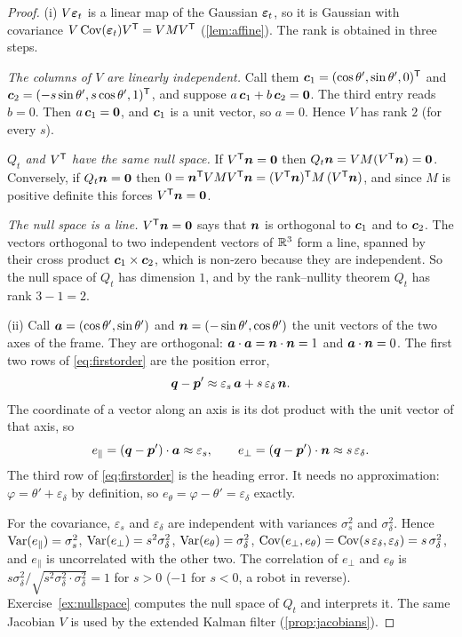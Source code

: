 \begin{proof}
(i) $V\bm{\varepsilon}_t$ is a linear map of the Gaussian $\bm{\varepsilon}_t$, so it is
Gaussian with covariance $V\operatorname{Cov}(\bm{\varepsilon}_t)V^{\mathsf{T}}=VMV^{\mathsf{T}}$
(\cref{lem:affine}). The rank is obtained in three steps.

\emph{The columns of $V$ are linearly independent.} Call them
$\bm{c}_1=(\cos\theta',\sin\theta',0)^{\mathsf{T}}$ and
$\bm{c}_2=(-s\sin\theta',s\cos\theta',1)^{\mathsf{T}}$, and suppose
$a\,\bm{c}_1+b\,\bm{c}_2=\bm{0}$. The third entry reads $b=0$. Then
$a\,\bm{c}_1=\bm{0}$, and $\bm{c}_1$ is a unit vector, so $a=0$. Hence
$V$ has rank $2$ (for every $s$).

\emph{$Q_t$ and $V^{\mathsf{T}}$ have the same null space.} If $V^{\mathsf{T}}\bm{n}=\bm{0}$
then $Q_t\bm{n}=VM(V^{\mathsf{T}}\bm{n})=\bm{0}$. Conversely, if
$Q_t\bm{n}=\bm{0}$ then
$0=\bm{n}^{\mathsf{T}} VMV^{\mathsf{T}}\bm{n}=(V^{\mathsf{T}}\bm{n})^{\mathsf{T}} M\,(V^{\mathsf{T}}\bm{n})$, and since $M$ is
positive definite this forces $V^{\mathsf{T}}\bm{n}=\bm{0}$.

\emph{The null space is a line.} $V^{\mathsf{T}}\bm{n}=\bm{0}$ says that $\bm{n}$
is orthogonal to $\bm{c}_1$ and to $\bm{c}_2$. The vectors orthogonal to
two independent vectors of $\mathbb{R}^3$ form a line, spanned by their cross
product $\bm{c}_1\times\bm{c}_2$, which is non-zero because they are
independent. So the null space of $Q_t$ has dimension $1$, and by the
rank--nullity theorem $Q_t$ has rank $3-1=2$.

(ii) Call $\bm{a}=(\cos\theta',\sin\theta')$ and
$\bm{n}=(-\sin\theta',\cos\theta')$ the unit vectors of the two axes of
the frame. They are orthogonal:
$\bm{a}\cdot\bm{a}=\bm{n}\cdot\bm{n}=1$ and $\bm{a}\cdot\bm{n}=0$.
The first two rows of \eqref{eq:firstorder} are the position error,
\[
  \bm{q}-\bm{p}'\approx\varepsilon_s\,\bm{a}+s\,\varepsilon_\delta\,\bm{n} .
\]
The coordinate of a vector along an axis is its dot product with the unit
vector of that axis, so
\[
  e_\parallel=(\bm{q}-\bm{p}')\cdot\bm{a}\approx\varepsilon_s,\qquad
  e_\perp=(\bm{q}-\bm{p}')\cdot\bm{n}\approx s\,\varepsilon_\delta .
\]
The third row of \eqref{eq:firstorder} is the heading error. It needs no
approximation: $\varphi=\theta'+\varepsilon_\delta$ by definition, so
$e_\theta=\varphi-\theta'=\varepsilon_\delta$ exactly.

For the covariance, $\varepsilon_s$ and $\varepsilon_\delta$ are
independent with variances $\sigma_s^2$ and $\sigma_\delta^2$. Hence
$\operatorname{Var}(e_\parallel)=\sigma_s^2$, $\operatorname{Var}(e_\perp)=s^2\sigma_\delta^2$,
$\operatorname{Var}(e_\theta)=\sigma_\delta^2$,
$\operatorname{Cov}(e_\perp,e_\theta)=\operatorname{Cov}(s\,\varepsilon_\delta,\varepsilon_\delta)
=s\,\sigma_\delta^2$, and $e_\parallel$ is uncorrelated with the other
two. The correlation of $e_\perp$ and $e_\theta$ is
$s\sigma_\delta^2/\sqrt{s^2\sigma_\delta^2\cdot\sigma_\delta^2}=1$ for
$s>0$ ($-1$ for $s<0$, a robot in reverse).
Exercise~\ref{ex:nullspace} computes the null space of $Q_t$ and
interprets it. The same Jacobian $V$ is used by the extended Kalman filter
(\cref{prop:jacobians}).
\end{proof}

